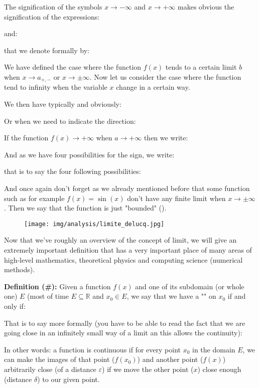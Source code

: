 	The signification of the symbols $x\rightarrow -\infty$ and $x\rightarrow +\infty$ makes obvious the signification of the expressions:
	
	and:
	
	that we denote formally by:	
	
	We have defined the case where the function $f (x)$ tends to a certain limit $b$ when $x\rightarrow a_{+,-}$ or $x\rightarrow \pm \infty$. Now let us consider the case where the function tend to infinity when the variable $x$ change in a certain way.
	
	We then have typically and obviously:
	
	Or when we need to indicate the direction:
	
	If the function $f(x) \rightarrow +\infty$ when $a \rightarrow +\infty$ then we write:
	
	And as we have four possibilities for the sign, we write:
	
	that is to say the four following possibilities:
	
	And once again don't forget as we already mentioned before that some function such as for example $f(x)=\sin(x)$ don't have any finite limit when $x\rightarrow \pm \infty$. Then we say that the function is just "bounded" ().
	\begin{figure}[H]
		\centering
		\texttt{[image: img/analysis/limite\_delucq.jpg]}
	\end{figure}
	Now that we've roughly an overview of the concept of limit, we will give an extremely important definition that has a very important place of many areas of high-level mathematics, theoretical physics and computing science (numerical methods).
	
	\textbf{Definition (\#\mydef):} Given a function $f(x)$ and one of its subdomain (or whole one) $E$ (most of time $E \subseteq \mathbb{R}$ and $x_0\in E$, we say that we have a "" on $x_0$ if and only if:
	
	That is to say more formally (you have to be able to read the fact that we are going close in an infinitely small way of a limit an this allows the continuity):
	
	In other words: a function is continuous if for every point $x_0$ in the domain $E$, we can make the images of that point ($f(x_0)$) and another point ($f(x)$) arbitrarily close (of a distance $\varepsilon$) if we move the other point ($x$) close enough (distance $\delta$) to our given point.
	

